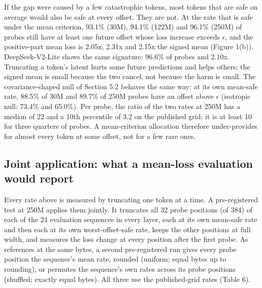 \documentclass[10pt]{article}
\begin{document}
If the gap were caused by a few catastrophic tokens, most tokens that are safe on average would also be safe at every offset. They are not. At the rate that is safe under the mean criterion, 93.1\% (30M), 94.1\% (122M) and 96.1\% (250M) of probes still have at least one future offset whose loss increase exceeds $\epsilon$, and the positive-part mean loss is 2.05x, 2.31x and 2.15x the signed mean (Figure 1(b)). DeepSeek-V2-Lite shows the same signature: 96.6\% of probes and 2.10x. Truncating a token's latent hurts some future predictions and helps others; the signed mean is small because the two cancel, not because the harm is small. The covariance-shaped null of Section 5.2 behaves the same way: at its own mean-safe rate, 88.5\% of 30M and 89.7\% of 250M probes have an offset above $\epsilon$ (isotropic null: 73.4\% and 65.0\%). Per probe, the ratio of the two rates at 250M has a median of 22 and a 10th percentile of 3.2 on the published grid; it is at least 10 for three quarters of probes. A mean-criterion allocation therefore under-provides for almost every token at some offset, not for a few rare ones.

\subsection{Joint application: what a mean-loss evaluation would report}

Every rate above is measured by truncating one token at a time. A pre-registered test at 250M applies them jointly. It truncates all 32 probe positions (of 384) of each of the 24 evaluation sequences in every layer, each at its own mean-safe rate and then each at its own worst-offset-safe rate, keeps the other positions at full width, and measures the loss change at every position after the first probe. As references at the same bytes, a second pre-registered run gives every probe position the sequence's mean rate, rounded (uniform; equal bytes up to rounding), or permutes the sequence's own rates across its probe positions (shuffled; exactly equal bytes). All three use the published-grid rates (Table 6).
\end{document}
